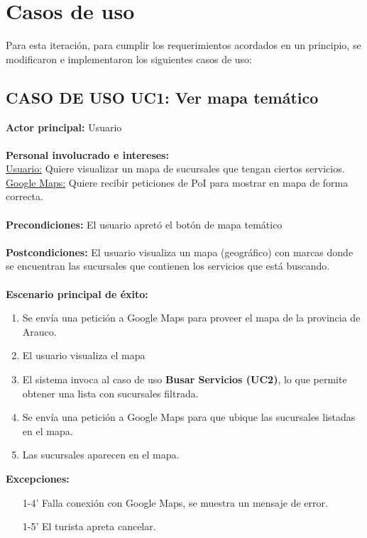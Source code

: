 \documentclass[11pt]{article}
\begin{document}
\section*{Casos de uso}
Para esta iteración, para cumplir los requerimientos acordados en un principio, se modificaron e implementaron los siguientes casos de uso:

\subsection*{\textbf{CASO DE USO UC1:} Ver mapa temático }
\textbf{Actor principal:} Usuario\\
\\
\textbf{Personal involucrado e intereses: }\\
\underline{Usuario:} Quiere visualizar un mapa de sucursales que tengan ciertos servicios.\\\underline{Google Maps:} Quiere recibir peticiones de PoI para mostrar en mapa de forma correcta.\\
\\
\textbf{Precondiciones:} El usuario apretó el botón de mapa temático\\
\\
\textbf{Postcondiciones:} El usuario visualiza un mapa (geográfico) con marcas donde se encuentran las sucursales que contienen los servicios que está buscando.\\
\\
\textbf{Escenario principal de éxito:}
\begin{enumerate}
\item Se envía una petición a Google Maps para proveer el mapa de la provincia de Arauco.
\item El usuario visualiza el mapa
\item El sistema invoca al caso de uso \textbf{Busar Servicios (UC2)}, lo que permite obtener una lista con sucursales filtrada.
\item Se envía una petición a Google Maps para que ubique las sucursales listadas en el mapa.
\item Las sucursales aparecen en el mapa.
\end{enumerate}
\textbf{Excepciones:}
\begin{enumerate}
\item[1-4'] Falla conexión con Google Maps, se muestra un mensaje de error.
\item[1-5'] El turista apreta cancelar.
\end{enumerate}
\end{document}
